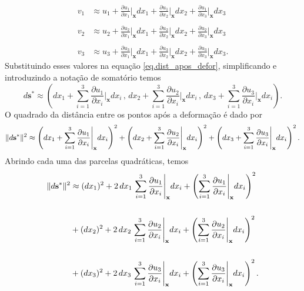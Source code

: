 \begin{align*}
v_1&\approx u_1+\frac{\partial u_1}{\partial x_1}\Bigg\vert_{\mathbf{x}}dx_1+\frac{\partial u_1}{\partial x_2}\Bigg\vert_{\mathbf{x}}dx_2+\frac{\partial u_1}{\partial x_3}\Bigg\vert_{\mathbf{x}}dx_3\\\\
v_2&\approx u_2+\frac{\partial u_2}{\partial x_1}\Bigg\vert_{\mathbf{x}}dx_1+\frac{\partial u_2}{\partial x_2}\Bigg\vert_{\mathbf{x}}dx_2+\frac{\partial u_2}{\partial x_3}\Bigg\vert_{\mathbf{x}}dx_3\\\\
v_3&\approx u_3+\frac{\partial u_3}{\partial x_1}\Bigg\vert_{\mathbf{x}}dx_1+\frac{\partial u_3}{\partial x_2}\Bigg\vert_{\mathbf{x}}dx_2+\frac{\partial u_3}{\partial x_3}\Bigg\vert_{\mathbf{x}}dx_3.
\end{align*}
Substituindo esses valores na equa\c{c}\~ao \ref{eq.dist_apos_defor}, simplificando e introduzindo a nota\c{c}\~ao de somat\'orio temos
\begin{equation*}
d\mathbf{s}^*\approx\left(dx_1+\sum_{i=1}^3\frac{\partial u_1}{\partial x_i}\Bigg\vert_{\mathbf{x}}dx_i\,,\,dx_2+\sum_{i=1}^3\frac{\partial u_2}{\partial x_i}\Bigg\vert_{\mathbf{x}}dx_i\,,\,dx_3+\sum_{i=1}^3\frac{\partial u_3}{\partial x_i}\Bigg\vert_{\mathbf{x}}dx_i\right).
\end{equation*}
O quadrado da dist\^ancia entre os pontos ap\'os a deforma\c{c}\~ao \'e dado por
\begin{equation*}
\lVert d\mathbf{s}^*\rVert^2\approx\left(dx_1+\sum_{i=1}^3\frac{\partial u_1}{\partial x_i}\Bigg\vert_{\mathbf{x}}dx_i\right)^2+\left(dx_2+\sum_{i=1}^3\frac{\partial u_2}{\partial x_i}\Bigg\vert_{\mathbf{x}}dx_i\right)^2+\left(dx_3+\sum_{i=1}^3\frac{\partial u_3}{\partial x_i}\Bigg\vert_{\mathbf{x}}dx_i\right)^2.
\end{equation*}
Abrindo cada uma das parcelas quadr\'aticas, temos
\begin{align*}
\lVert d\mathbf{s}^*\rVert^2&\approx(dx_1)^2+2\,dx_1\,\sum_{i=1}^3\frac{\partial u_1}{\partial x_i}\Bigg\vert_{\mathbf{x}}dx_i+\left(\sum_{i=1}^3\frac{\partial u_1}{\partial x_i}\Bigg\vert_{\mathbf{x}}dx_i\right)^2\\\\
&+(dx_2)^2+2\,dx_2\,\sum_{i=1}^3\frac{\partial u_2}{\partial x_i}\Bigg\vert_{\mathbf{x}}dx_i+\left(\sum_{i=1}^3\frac{\partial u_2}{\partial x_i}\Bigg\vert_{\mathbf{x}}dx_i\right)^2\\\\
&+(dx_3)^2+2\,dx_3\,\sum_{i=1}^3\frac{\partial u_3}{\partial x_i}\Bigg\vert_{\mathbf{x}}dx_i+\left(\sum_{i=1}^3\frac{\partial u_3}{\partial x_i}\Bigg\vert_{\mathbf{x}}dx_i\right)^2.
\end{align*}
